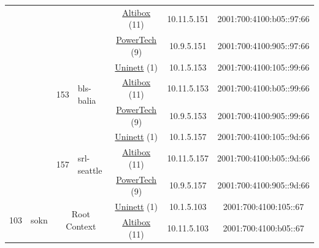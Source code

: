 \begin{small}
\begin{center}
\begin{longtable}{|c|c|c|c|c|c|c|c|}
  &  &  &  & \multicolumn{2}{|c|}{\tiny{\href{https://www.altibox.no}{Altibox} (11)}} & \tiny{10.11.5.151} & \tiny{2001:700:4100:b05::97:66} \\* \cline{5-5}\cline{6-6}\cline{7-7}\cline{8-8}
  &  &  &  & \multicolumn{2}{|c|}{\tiny{\href{http://www.powertech.no}{PowerTech} (9)}} & \tiny{10.9.5.151} & \tiny{2001:700:4100:905::97:66} \\* \cline{3-3}\cline{4-4}\cline{5-5}\cline{6-6}\cline{7-7}\cline{8-8}
  &  & \multirow{3}{*}{\tiny{153}} & \multicolumn{1}{|l|}{\multirow{3}{*}{\tiny{bls-balia}}} & \multicolumn{2}{|c|}{\tiny{\href{https://www.uninett.no}{Uninett} (1)}} & \tiny{10.1.5.153} & \tiny{2001:700:4100:105::99:66} \\* \cline{5-5}\cline{6-6}\cline{7-7}\cline{8-8}
  &  &  &  & \multicolumn{2}{|c|}{\tiny{\href{https://www.altibox.no}{Altibox} (11)}} & \tiny{10.11.5.153} & \tiny{2001:700:4100:b05::99:66} \\* \cline{5-5}\cline{6-6}\cline{7-7}\cline{8-8}
  &  &  &  & \multicolumn{2}{|c|}{\tiny{\href{http://www.powertech.no}{PowerTech} (9)}} & \tiny{10.9.5.153} & \tiny{2001:700:4100:905::99:66} \\* \cline{3-3}\cline{4-4}\cline{5-5}\cline{6-6}\cline{7-7}\cline{8-8}
  &  & \multirow{3}{*}{\tiny{157}} & \multicolumn{1}{|l|}{\multirow{3}{*}{\tiny{srl-seattle}}} & \multicolumn{2}{|c|}{\tiny{\href{https://www.uninett.no}{Uninett} (1)}} & \tiny{10.1.5.157} & \tiny{2001:700:4100:105::9d:66} \\* \cline{5-5}\cline{6-6}\cline{7-7}\cline{8-8}
  &  &  &  & \multicolumn{2}{|c|}{\tiny{\href{https://www.altibox.no}{Altibox} (11)}} & \tiny{10.11.5.157} & \tiny{2001:700:4100:b05::9d:66} \\* \cline{5-5}\cline{6-6}\cline{7-7}\cline{8-8}
  &  &  &  & \multicolumn{2}{|c|}{\tiny{\href{http://www.powertech.no}{PowerTech} (9)}} & \tiny{10.9.5.157} & \tiny{2001:700:4100:905::9d:66} \\ \hline
 \multirow{33}{*}{\tiny{103}} & \multicolumn{1}{|l|}{\multirow{33}{*}{\tiny{sokn}}} & \multicolumn{2}{|c|}{\multirow{3}{*}{\tiny{Root Context}}} & \multicolumn{2}{|c|}{\tiny{\href{https://www.uninett.no}{Uninett} (1)}} & \tiny{10.1.5.103} & \tiny{2001:700:4100:105::67} \\* \cline{5-5}\cline{6-6}\cline{7-7}\cline{8-8}
  &  & \multicolumn{2}{|c|}{} & \multicolumn{2}{|c|}{\tiny{\href{https://www.altibox.no}{Altibox} (11)}} & \tiny{10.11.5.103} & \tiny{2001:700:4100:b05::67} \\* \cline{5-5}\cline{6-6}\cline{7-7}\cline{8-8}

\end{longtable}
\end{center}
\end{small}
